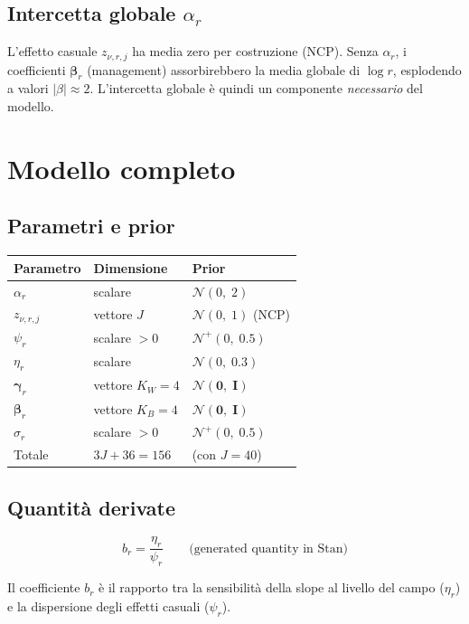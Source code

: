\documentclass[11pt, a4paper]{article}
\newcommand{\N}{\mathcal{N}}
\newcommand{\HN}{\mathcal{N}^+}
\renewcommand{\vec}[1]{\bm{#1}}
\begin{document}
\subsection{Intercetta globale $\alpha_r$}

L'effetto casuale $z_{\nu,r,j}$ ha media zero per costruzione (NCP).
Senza $\alpha_r$, i coefficienti $\vec{\beta}_r$ (management) assorbirebbero
la media globale di $\log r$, esplodendo a valori $|\beta| \approx 2$.
L'intercetta globale è quindi un componente \emph{necessario} del modello.

\section{Modello completo}

\subsection{Parametri e prior}

\medskip
\begin{tabular}{@{}lll@{}}
\toprule
Parametro & Dimensione & Prior \\
\midrule
$\alpha_r$ & scalare & $\N(0,\;2)$ \\
$z_{\nu,r,j}$ & vettore $J$ & $\N(0,\;1)$ (NCP) \\
$\psi_r$ & scalare $>0$ & $\HN(0,\;0.5)$ \\
$\eta_r$ & scalare & $\N(0,\;0.3)$ \\
$\vec{\gamma}_r$ & vettore $K_W = 4$ & $\N(\vec{0},\;\vec{I})$ \\
$\vec{\beta}_r$ & vettore $K_B = 4$ & $\N(\vec{0},\;\vec{I})$ \\
$\sigma_r$ & scalare $>0$ & $\HN(0,\;0.5)$ \\
\midrule
Totale & $3J + 36 = 156$ & (con $J = 40$) \\
\bottomrule
\end{tabular}

\subsection{Quantità derivate}

\[
  b_r = \frac{\eta_r}{\psi_r} \qquad \text{(generated quantity in Stan)}
\]

Il coefficiente $b_r$ è il rapporto tra la sensibilità della slope al livello
del campo ($\eta_r$) e la dispersione degli effetti casuali ($\psi_r$).
\end{document}
